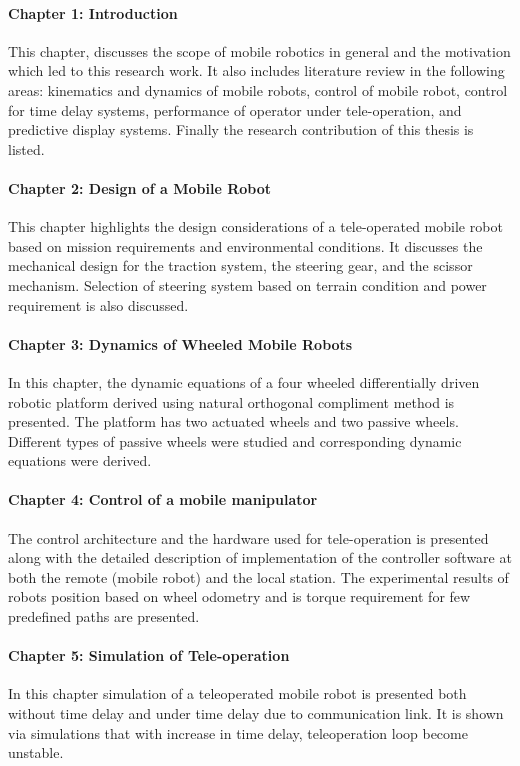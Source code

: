 \paragraph*{Chapter 1: Introduction\\}
This  chapter, discusses the scope of mobile robotics in general and the motivation which led to this research work. It also includes literature review in the following areas: kinematics and dynamics of mobile robots, control of mobile robot, control for time delay systems, performance of operator under tele-operation,  and predictive display systems. Finally the research contribution of this thesis is listed. 


\paragraph*{Chapter 2: Design of a Mobile Robot\\}
This chapter highlights the design considerations of a tele-operated mobile robot based on mission requirements and  environmental conditions.  It  discusses the mechanical design for the traction system, the steering gear, and the scissor mechanism. Selection of  steering system based on terrain condition and power requirement is also discussed.   
\paragraph*{Chapter 3: Dynamics of Wheeled Mobile Robots \\}
In this chapter, the dynamic equations of a four wheeled differentially driven robotic platform derived using natural orthogonal compliment method is presented. The platform has two actuated wheels and two passive wheels. Different types of passive wheels were studied and  corresponding dynamic equations were derived. 
\paragraph*{Chapter 4: Control of a mobile manipulator \\}
The control architecture and the hardware used for tele-operation is presented along with the detailed description of implementation of the controller software at both the remote (mobile robot)  and the local station. The experimental results of robots position based on wheel odometry and is torque requirement for few predefined paths are presented. 

\paragraph*{Chapter 5: Simulation of Tele-operation \\}
In this chapter simulation of a teleoperated mobile robot is presented both without time delay and  under time delay due to communication link. It is shown via simulations that with increase in time delay,  teleoperation loop become unstable. 
 

